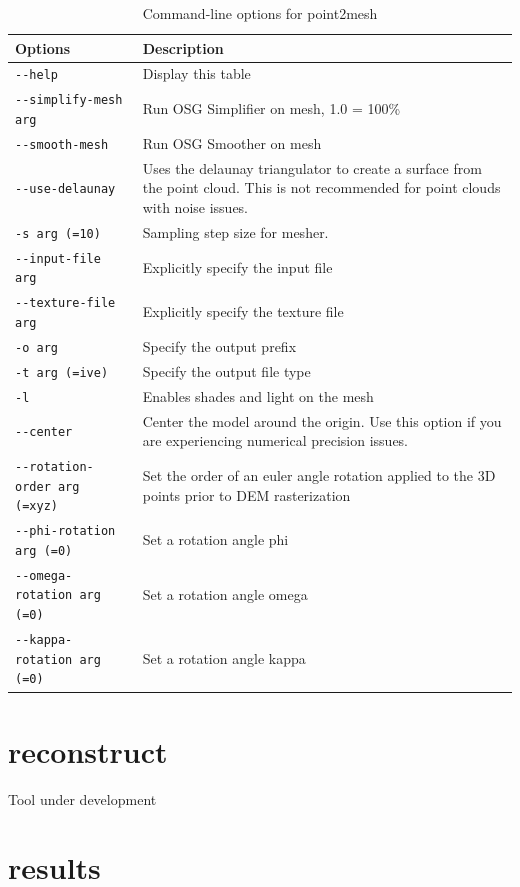 \begin{longtable}{|l|p{10cm}|}
\caption{Command-line options for point2mesh}
\label{tbl:point2mesh}
\endfirsthead
\endhead
\endfoot
\endlastfoot
\hline
Options & Description \\ \hline \hline
\verb#--help# & Display this table \\ \hline
\verb#--simplify-mesh arg# & Run OSG Simplifier on mesh, 1.0 = 100\% \\ \hline
\verb#--smooth-mesh# & Run OSG Smoother on mesh \\ \hline
\verb#--use-delaunay# & Uses the delaunay triangulator to create a surface from the point cloud. This is not recommended for point clouds with noise issues. \\ \hline
\verb#-s arg (=10)# & Sampling step size for mesher. \\ \hline
\verb#--input-file arg# & Explicitly specify the input file \\ \hline
\verb#--texture-file arg# & Explicitly specify the texture file \\ \hline
\verb#-o arg# & Specify the output prefix \\ \hline
\verb#-t arg (=ive)# & Specify the output file type \\ \hline
\verb#-l# & Enables shades and light on the mesh \\ \hline
\verb#--center# & Center the model around the origin. Use this option if you are experiencing numerical precision issues. \\ \hline
\verb#--rotation-order arg (=xyz)# & Set the order of an euler angle rotation applied to the 3D points prior to DEM rasterization \\ \hline
\verb#--phi-rotation arg (=0)# & Set a rotation angle phi \\ \hline
\verb#--omega-rotation arg (=0)# & Set a rotation angle omega \\ \hline
\verb#--kappa-rotation arg (=0)# & Set a rotation angle kappa \\ \hline
\end{longtable}

\section{reconstruct}
\label{reconstruct}

Tool under development

\section{results}
\label{results}

